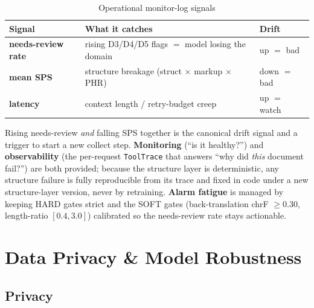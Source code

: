 \documentclass[12pt,a4paper]{article}
\begin{document}
\begin{table}[H]
\centering
\caption{Operational monitor-log signals}
\small
\begin{tabularx}{\linewidth}{@{} l L l @{}}
\toprule
\textbf{Signal} & \textbf{What it catches} & \textbf{Drift} \\
\midrule
\textbf{needs-review rate} & rising D3/D4/D5 flags $=$ model losing the domain & up $=$ bad \\
\textbf{mean SPS} & structure breakage (struct $\times$ markup $\times$ PHR) & down $=$ bad \\
\textbf{latency} & context length / retry-budget creep & up $=$ watch \\
\bottomrule
\end{tabularx}
\end{table}

Rising needs-review \emph{and} falling SPS together is the canonical drift signal and a trigger to start a new collect step. \textbf{Monitoring} (``is it healthy?'') and \textbf{observability} (the per-request \texttt{ToolTrace} that answers ``why did \emph{this} document fail?'') are both provided; because the structure layer is deterministic, any structure failure is fully reproducible from its trace and fixed in code under a new structure-layer version, never by retraining. \textbf{Alarm fatigue} is managed by keeping HARD gates strict and the SOFT gates (back-translation chrF $\geq 0.30$, length-ratio $[0.4, 3.0]$) calibrated so the needs-review rate stays actionable.

\section{Data Privacy \& Model Robustness}

\subsection{Privacy}
\end{document}
